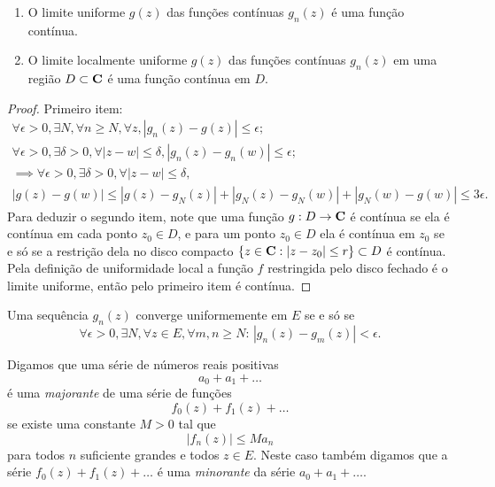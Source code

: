 \begin{teorema}
\label{t:limite-uniforme}
\begin{enumerate}
\item
O limite uniforme $g(z)$ das funções contínuas $g_n(z)$ é uma função contínua.
\item
O limite localmente uniforme $g(z)$ das funções contínuas $g_n(z)$
em uma região $D\subset \mathbf{C}$ é uma função contínua em $D$.
\end{enumerate}
\end{teorema}
\begin{proof}
Primeiro item:
\begin{align*}
\forall \epsilon>0, \exists N, \forall n\geq N, \forall z, |g_n(z)-g(z)|\leq\epsilon; \\
\forall \epsilon>0, \exists \delta>0, \forall |z-w|\leq\delta, |g_n(z)-g_n(w)|\leq\epsilon; \\
\implies \forall \epsilon>0, \exists \delta>0, \forall |z-w|\leq\delta, \\
|g(z)-g(w)|\leq |g(z)-g_N(z)| + |g_N(z)-g_N(w)| + |g_N(w)-g(w)| \leq 3\epsilon.
\end{align*}
Para deduzir o segundo item, note que uma função $g : D\to\mathbf{C}$ é contínua
se ela é contínua em cada ponto $z_0\in D$, e para um ponto $z_0\in D$
ela é contínua em $z_0$ se e só se a restrição dela no
disco compacto $\{z\in\mathbf{C}: |z-z_0|\leq r\} \subset D$ é contínua.
Pela definição de uniformidade local a função $f$ restringida pelo disco fechado
é o limite uniforme, então pelo primeiro item é contínua.
\end{proof}


\begin{problema}
\label{criterio-cauchy-uniforme}
Uma sequência $g_n(z)$ converge uniformemente em $E$
se e só se
\[ \forall \epsilon>0, \exists N, \forall z\in E,\forall m,n\geq N: \, |g_n(z)-g_m(z)|<\epsilon .\]
\end{problema}

Digamos que uma série de números reais positivas
\[ a_0 + a_1 + \dots \]
é uma \emph{majorante} de uma série de funções
\[ f_0(z) + f_1(z) + \dots \]
se existe uma constante $M>0$ tal que
\[ |f_n(z)| \leq M a_n \]
para todos $n$ suficiente grandes e todos $z\in E$.
Neste caso também digamos que a série $f_0(z) + f_1(z) + \dots$ é uma \emph{minorante}
da série $a_0 + a_1 + \dots$.

